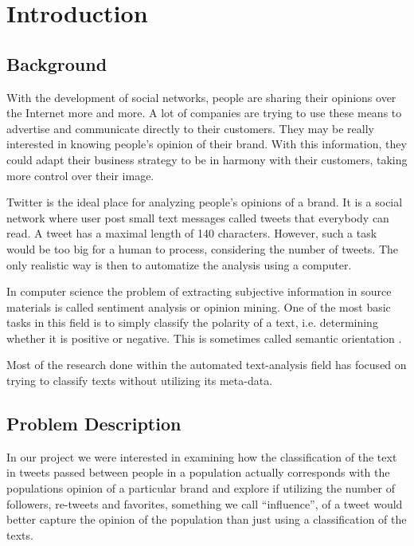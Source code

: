 \documentclass[a4paper,12pt]{report}
\begin{document}
\tableofcontents

\clearpage
\chapter{Introduction}

\section{Background}
With the development of social networks, people are sharing their opinions over the Internet more and more.
A lot of companies are trying to use these means to advertise and communicate directly to their customers.
They may be really interested in knowing people's opinion of their brand.
With this information, they could adapt their business strategy to be in harmony with their customers, taking more control over their image.

Twitter \cite{TwitterAbout} is the ideal place for analyzing people's opinions of a brand. 
It is a social network where user post small text messages called tweets that everybody can read. 
A tweet has a maximal length of 140 characters. However, such a task would be too big for a human to process, considering the number of tweets.
The only realistic way is then to automatize the analysis using a computer.

In computer science the problem of extracting subjective information in source materials is called sentiment analysis or opinion mining. 
One of the most basic tasks in this field is to simply classify the polarity of a text, i.e. determining whether it is positive or negative. 
This is sometimes called semantic orientation \cite{SenWiki}. 

Most of the research done within the automated text-analysis field has focused on trying to classify texts without utilizing its meta-data.

\section{Problem Description}

In our project we were interested in examining how the classification of the text in tweets passed between people in a population actually corresponds with the populations opinion of a particular brand and explore if utilizing the number of followers, re-tweets and favorites, something we call ``influence'', of a tweet would better capture the opinion of the population than just using a classification of the texts. 
\end{document}
